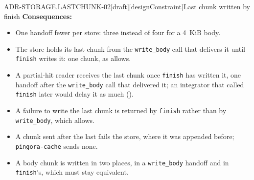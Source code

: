 \begin{requirement}{ADR-STORAGE.LASTCHUNK-02}[draft][designConstraint]{Last chunk written by finish}
  \textbf{Consequences:}
  \begin{itemize}
    \item[+] One handoff fewer per store: three instead of four for a 4~KiB
      body.
    \item[--] The store holds its last chunk from the \texttt{write\_body}
      call that delivers it until \texttt{finish} writes it: one chunk, as
       allows.
    \item[--] A partial-hit reader receives the last chunk once
      \texttt{finish} has written it, one handoff after the
      \texttt{write\_body} call that delivered it; an integrator that called
      \texttt{finish} later would delay it as much
      ().
    \item[--] A failure to write the last chunk is returned by
      \texttt{finish} rather than by \texttt{write\_body}, which
       allows.
    \item[--] A chunk sent after the last fails the store, where it was
      appended before; \texttt{pingora-cache} sends none.
    \item[--] A body chunk is written in two places, in a \texttt{write\_body}
      handoff and in \texttt{finish}'s, which must stay equivalent.
  \end{itemize}



\end{requirement}

